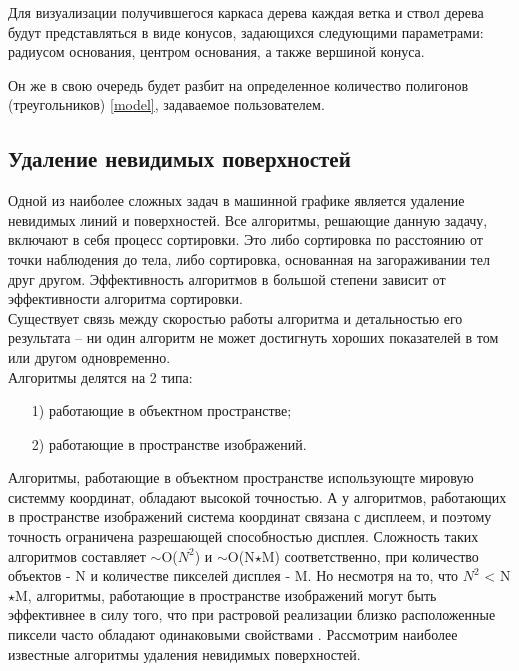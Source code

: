 \documentclass[54pt, a4paper]{article}
\begin{document}
	Для визуализации получившегося каркаса дерева каждая ветка и ствол дерева будут представляться в виде конусов, задающихся следующими параметрами: радиусом основания, центром основания, а также вершиной конуса.
	
	Он же в свою очередь будет разбит на определенное количество полигонов (треугольников) \ref{model}, задаваемое пользователем.
	
	
	\subsection{Удаление невидимых поверхностей}
	Одной из наиболее сложных задач в машинной графике является удаление невидимых линий и поверхностей. Все алгоритмы, решающие данную задачу, включают в себя процесс сортировки. Это либо сортировка по расстоянию от точки наблюдения до тела, либо сортировка, основанная на загораживании тел друг другом. Эффективность алгоритмов в большой степени зависит от эффективности алгоритма сортировки.\\
	
	Существует связь между скоростью работы алгоритма и детальностью его результата – ни один алгоритм не может достигнуть хороших показателей в том или другом одновременно.\\
	
	Алгоритмы делятся на 2 типа:
	\begin{enumerate}
	\item[1)]работающие в объектном пространстве;
	\item[2)]работающие в пространстве изображений.
	\end{enumerate}

	Алгоритмы, работающие в объектном пространстве использующте мировую системму координат, обладают высокой точностью. А у алгоритмов, работающих в пространстве изображений система координат связана с дисплеем, и поэтому точность ограничена разрешающей способностью дисплея. Сложность таких алгоритмов составляет $\sim$O($N^2$) и $\sim$O(N$\star$M)  соответственно, при количество объектов - N и количестве пикселей дисплея - M. Но несмотря на то, что $N^2$ < N$\star$M, алгоритмы, работающие в пространстве изображений могут быть эффективнее в силу того, что при растровой реализации близко расположенные пиксели часто обладают одинаковыми свойствами \cite{rod}. Рассмотрим наиболее известные алгоритмы удаления невидимых поверхностей.
\end{document}
